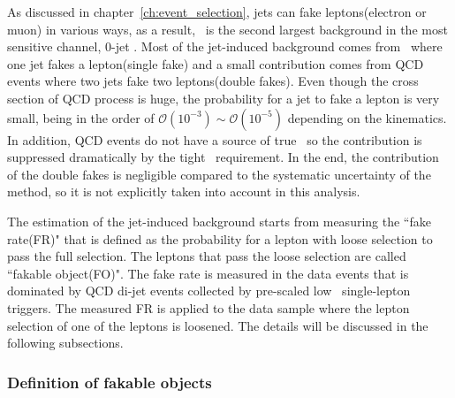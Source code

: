 As discussed in chapter~\ref{ch:event_selection}, 
jets can fake leptons(electron or muon) in various ways, 
as a result, \Wjets\ is the second largest background in the most 
sensitive channel, 0-jet \DF. 
Most of the jet-induced background comes from \Wjets\ where one jet fakes a lepton(single fake)
and a small contribution comes from QCD events where two jets fake two leptons(double fakes).  
Even though the cross section of QCD process is huge, the probability for a jet 
to fake a lepton is very small, being in the order of 
$\mathcal{O}(10^{-3}) \sim \mathcal{O}(10^{-5})$
depending on the kinematics. In addition, QCD events do not have a source of true \met\, 
so the contribution is suppressed dramatically by the tight \met\ requirement. 
In the end, the contribution of the double fakes is negligible compared to the 
systematic uncertainty of the method, so it is not explicitly taken into account in this analysis. 

The estimation of the jet-induced background starts from measuring the ``fake rate(FR)"
that is defined as the probability for a lepton with loose selection to pass the full selection. 
The leptons that pass the loose selection are called ``fakable object(FO)". The fake rate is 
measured in the data events that is dominated by QCD di-jet events collected 
by pre-scaled low \pt\ single-lepton triggers. 
The measured FR is applied to the data sample where the lepton selection 
of one of the leptons is loosened. 
The details will be discussed in the following subsections.

\subsubsection{Definition of fakable objects}

